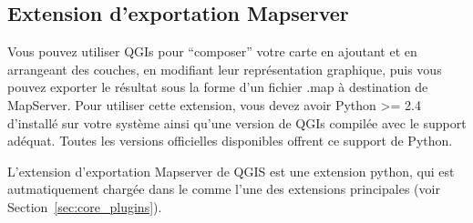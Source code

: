 
%
%

\subsection{Extension d'exportation Mapserver}\label{sec:mapserver_export}

Vous pouvez utiliser QGIs pour ``composer'' votre carte en ajoutant et en arrangeant des couches, en modifiant leur repr\'esentation graphique, puis vous pouvez exporter le r\'esultat sous la forme d'un fichier .map \`a destination de MapServer. Pour utiliser cette extension, vous devez avoir Python >= 2.4 d'install\'e sur votre syst\`eme ainsi qu'une version de QGIs compil\'ee avec le support ad\'equat. Toutes les versions officielles disponibles offrent ce support de Python.

L'extension d'exportation Mapserver de QGIS \CURRENT est une extension python, qui est autmatiquement charg\'ee dans le  comme l'une des extensions principales (voir Section~\ref{sec:core_plugins}).

%

